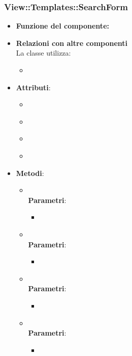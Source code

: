  \subsubsection{View::Templates::SearchForm}
 \begin{itemize}
 \item\textbf{Funzione del componente:}
 \item\textbf{Relazioni con altre componenti}\\
 La classe utilizza:
 	\begin{itemize}
 		\item
 	\end{itemize}
 \item\textbf{Attributi}:
 	\begin{itemize}
 		\item\code{}\\
 		\item\code{}\\
 		\item\code{}\\
 		\item\code{}\\
 	\end{itemize}
 \item\textbf{Metodi}:
 	\begin{itemize}
 		\item\code{}\\
 		\textbf{Parametri}:
 			\begin{itemize}
 				\item\code{}\\
 			\end{itemize}
 		\item\code{}\\
 		\textbf{Parametri}:
 			\begin{itemize}
 				\item\code{}\\
 			\end{itemize}
 		\item\code{}\\
 		\textbf{Parametri}:
 			\begin{itemize}
 				\item\code{}\\
 			\end{itemize}
 		\item\code{}\\
 		\textbf{Parametri}:
 			\begin{itemize}
 				\item\code{}\\
 			\end{itemize}
 	\end{itemize}
 \end{itemize}